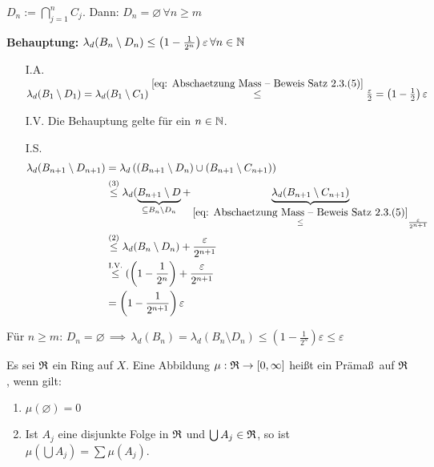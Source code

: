 \documentclass[a4paper,twoside,DIV15,BCOR12mm,chapterprefix=true,headings=onelinechapter]{scrbook}
\begin{document}
\begin{beweis}
\begin{enumerate}
\(D_{n}:=\bigcap_{j=1}^{n}{C_{j}}\). Dann: \(D_{n}=\varnothing\,\forall n\geq m\)

\textbf{Behauptung:} \(\lambda_{d}(B_{n}\setminus D_{n})\leq\left(1-\frac{1}{2^{n}}\right)\varepsilon\,\forall n\in\mathbb{N}\)
\begin{beweis}
\begin{itemize}
\item[I.A.] \(\lambda_{d}(B_{1}\setminus D_{1})=\lambda_{d}(B_{1}\setminus C_{1})\overset{\eqref{eq: Abschaetzung Mass -- Beweis Satz 2.3.(5)}}{\leq}\frac{\varepsilon}{2}=\left(1-\frac{1}{2}\right)\varepsilon\) \checkmark
\item[I.V.] Die Behauptung gelte f\"ur ein \(n\in\mathbb{N}\).
\item[I.S.] \begin{align*}
    \lambda_{d}(B_{n+1}\setminus D_{n+1})&=\lambda_{d}\left((B_{n+1}\setminus D_{n})\cup(B_{n+1}\setminus C_{n+1})\right)\\
    &\overset{(3)}{\leq}\lambda_{d}(\underbrace{B_{n+1}\setminus D}_{\subseteq B_{n}\setminus D_{n}}+\underbrace{\lambda_{d}(B_{n+1}\setminus C_{n+1})}_{\overset{\eqref{eq: Abschaetzung Mass -- Beweis Satz 2.3.(5)}}{\leq}\frac{\varepsilon}{2^{n+1}}}\\
    &\overset{(2)}{\leq}\lambda_{d}(B_{n}\setminus D_{n})+\frac{\varepsilon}{2^{n+1}}\\
    &\overset{\text{I.V.}}{\leq}(\left(1-\frac{1}{2^{n}}\right)+\frac{\varepsilon}{2^{n+1}}\\
&=\left(1-\frac{1}{2^{n+1}}\right)\varepsilon
    \end{align*}
\end{itemize}
\end{beweis}

F\"ur \(n\geq m:\,D_{n}=\varnothing\,\implies\,\lambda_{d}(B_{n})=\lambda_{d}(B_{n}\setminus D_{n})\leq\left(1-\frac{1}{2^{n}}\right)\varepsilon\leq\varepsilon\)
\end{enumerate}
\end{beweis}

\begin{definition}
Es sei \(\mathfrak{R}\) ein Ring auf \(X\). Eine Abbildung \(\mu:\mathfrak{R}\to[0,\infty]\) 
hei\ss t ein Pr\"ama\ss \ auf \(\mathfrak{R}\), wenn gilt:
\begin{enumerate}
\item \(\mu(\varnothing)=0\)
\item Ist \(A_{j}\) eine disjunkte Folge in \(\mathfrak{R}\) und \(\bigcup{A_{j}}\in\mathfrak{R}\), so ist \(\mu\left(\bigcup{A_{j}}\right)=\sum{\mu(A_{j})}\).
\end{enumerate}
\end{definition}
\end{document}
